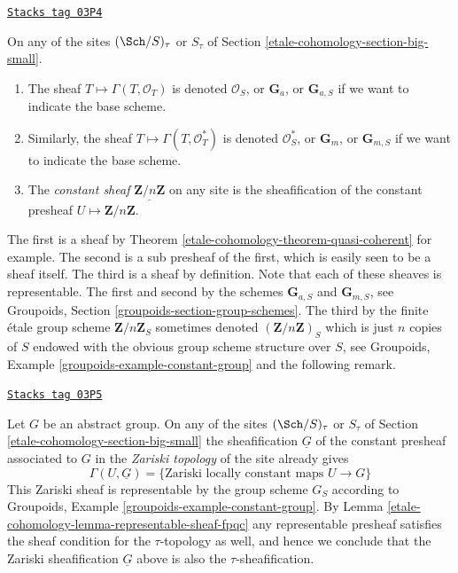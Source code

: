 \begin{definition}
\label{etale-cohomology-definition-additive-sheaf}
\href{https://stacks.math.columbia.edu/tag/03P4}{\texttt{Stacks tag 03P4}}

On any of the sites $(\Sch/S)_\tau$ or $S_\tau$ of
Section \ref{etale-cohomology-section-big-small}.
\begin{enumerate}
\item The sheaf $T \mapsto \Gamma(T, \mathcal{O}_T)$ is denoted
$\mathcal{O}_S$, or $\mathbf{G}_a$, or $\mathbf{G}_{a, S}$ if we
want to indicate the base scheme.
\item Similarly, the sheaf
$T \mapsto \Gamma(T, \mathcal{O}^*_T)$ is denoted $\mathcal{O}_S^*$, or
$\mathbf{G}_m$, or $\mathbf{G}_{m, S}$ if we want
to indicate the base scheme.
\item The {\it constant sheaf} $\underline{\mathbf{Z}/n\mathbf{Z}}$ on any
site is the sheafification of the constant presheaf
$U \mapsto \mathbf{Z}/n\mathbf{Z}$.
\end{enumerate}
\end{definition}

The first is a sheaf by
Theorem \ref{etale-cohomology-theorem-quasi-coherent}
for example. The second is a sub presheaf of the first, which is easily seen
to be a sheaf itself. The third is a sheaf by definition.
Note that each of these sheaves is representable.
The first and second by the schemes $\mathbf{G}_{a, S}$ and
$\mathbf{G}_{m, S}$, see
Groupoids, Section \ref{groupoids-section-group-schemes}.
The third by the finite \'etale group scheme $\mathbf{Z}/n\mathbf{Z}_S$
sometimes denoted $(\mathbf{Z}/n\mathbf{Z})_S$
which is just $n$ copies of $S$ endowed
with the obvious group scheme structure over $S$, see
Groupoids, Example \ref{groupoids-example-constant-group}
and the following remark.

\begin{remark}
\label{etale-cohomology-remark-constant-locally-constant-maps}
\href{https://stacks.math.columbia.edu/tag/03P5}{\texttt{Stacks tag 03P5}}

Let $G$ be an abstract group.
On any of the sites $(\Sch/S)_\tau$ or $S_\tau$ of
Section \ref{etale-cohomology-section-big-small}
the sheafification $\underline{G}$
of the constant presheaf associated to $G$ in the
{\it Zariski topology} of the site already gives
$$
\Gamma(U, \underline{G}) =
\{\text{Zariski locally constant maps }U \to G\}
$$
This Zariski sheaf is representable by the group scheme $G_S$ according to
Groupoids, Example \ref{groupoids-example-constant-group}.
By
Lemma \ref{etale-cohomology-lemma-representable-sheaf-fpqc}
any representable presheaf satisfies the sheaf condition for the
$\tau$-topology as well, and hence we conclude that the Zariski
sheafification $\underline{G}$ above is also the $\tau$-sheafification.
\end{remark}

